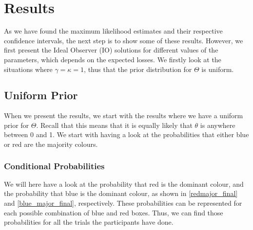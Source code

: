 \chapter{Results}

As we have found the maximum likelihood estimates and their respective confidence intervals, the next step is to show some of these results. However, we first present the Ideal Observer (IO) solutions for different values of the parameters, which depends on the expected losses. We firstly look at the situations where $\gamma=\kappa=1$, thus that the prior distribution for $\Theta$ is uniform. 

\section{Uniform Prior}
When we present the results, we start with the results where we have a uniform prior for $\Theta$. Recall that this means that it is equally likely that $\theta$ is anywhere between 0 and 1. We start with having a look at the probabilities that either blue or red are the majority colours. 

\subsection{Conditional Probabilities}
We will here have a look at the probability that red is the dominant colour, and the probability that blue is the dominant colour, as shown in \eqref{redmajor_final} and \eqref{blue_major_final}, respectively. These probabilities can be represented for each possible combination of blue and red boxes. Thus, we can find those probabilities for all the trials the participants have done. 

